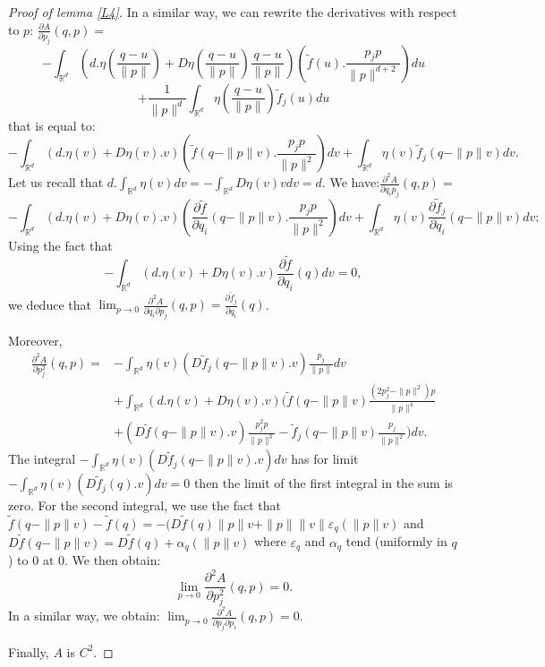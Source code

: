 \documentclass{dcds}
\theoremstyle{definition}
\begin{document}
\begin{proof}[Proof of lemma \ref{L4}]
 In a similar way, we can rewrite the derivatives with respect to $p$: $ \frac{\partial A}{\partial p_j}(q,p)=$
 $$
-\int_{{\mathbb {R}}^d}\left(d.\eta\left( \frac{q-u}{\| p\|}\right)+D\eta\left( \frac{q-u}{\| p\|}\right) \frac{q-u}{\| p\|}\right)(\tilde f(u).\frac{p_jp}{\| p\|^{d+2}})du$$$$+\frac{1}{\| p\|^d}\int_{{\mathbb {R}}^d}\eta(\frac{q-u}{\| p\|})\tilde f_j(u)du$$
 that is equal to:
 $$-\int_{{\mathbb {R}}^d}\left( d.\eta(v)+D\eta (v).v\right)(\tilde f(q-\| p\|v).\frac{p_jp}{\| p\|^2})dv + \int_{{\mathbb {R}}^d}\eta (v)\tilde f_j(q-\| p\|v)dv.$$
 Let us recall that $d.\int_{{\mathbb {R}}^d}\eta(v)dv=-\int_{{\mathbb {R}}^d}D\eta(v)vdv=d$.
 We have:$\frac{\partial^2A}{\partial q_ip_j}(q,p)=$
 $$-\int_{{\mathbb {R}}^d}\left( d.\eta(v)+D\eta (v).v\right)(\frac{\partial \tilde f}{\partial q_i}(q-\| p\|v).\frac{p_jp}{\| p\|^2})dv+ \int_{{\mathbb {R}}^d}\eta (v)\frac{\partial \tilde f_j}{\partial q_i}(q-\| p\|v)dv;$$
 Using the fact that $$-\int_{{\mathbb {R}}^d}\left( d.\eta(v)+D\eta (v).v\right)\frac{\partial \tilde f}{\partial q_i}(q )dv=0,$$ we deduce that
 $\displaystyle{\lim_{p\rightarrow 0}\frac{\partial^2 A}{\partial q_i\partial p_j}(q,p)=\frac{\partial\tilde  f_j}{\partial q_i}(q)}$.

 Moreover,
 \begin{equation*}\begin{split} \frac{\partial^2A}{\partial p_j^2} (q,p )=&-\int_{{\mathbb {R}}^d}\eta(v)(D\tilde f_j(q-\| p\|v).v)\frac{p_j}{\| p\|}dv \\ & +
  \int_{{\mathbb {R}}^d}(d.\eta (v)+ D\eta (v).v)( \tilde f(q-\| p\| v)\frac{(2p_j^2-\| p\|^2)p}{\| p\|^4} \\ & +( D\tilde f(q-\| p\| v).v )\frac{p_j^2p}{\| p\|^3}-\tilde f_j(q-\| p\| v)\frac{p_j}{\| p\|^2})dv.\end{split}\end{equation*}
 The  integral  $-\int_{{\mathbb {R}}^d}\eta(v)(D\tilde f_j(q-\| p\|v).v) dv$ has for limit $-\int_{{\mathbb {R}}^d}\eta(v)(D\tilde f_j(q).v )dv=0$ then the limit of the first integral in the sum is zero. For the second integral, we use the fact that $\tilde f(q-\| p\| v)-\tilde f(q)=-(D\tilde f(q)\| p\| v+\|p\| \| v\| \varepsilon_q(\| p\|v)$ and $D\tilde f(q-\| p\| v)=D\tilde f(q)+\alpha_q(\| p\| v)$ where $\varepsilon_q$ and $\alpha_q$ tend (uniformly in $q$) to $0$ at $0$. We then obtain:
 $$\lim_{p\rightarrow 0}\frac{\partial^2A}{\partial p_j^2}(q,p)=0.$$
 In a similar way, we obtain: $\displaystyle{\lim_{p\rightarrow 0}\frac{\partial^2A}{\partial p_j\partial p_i}(q,p)=0}.$

 Finally, $A$ is $C^2$.\end{proof}
\end{document}

